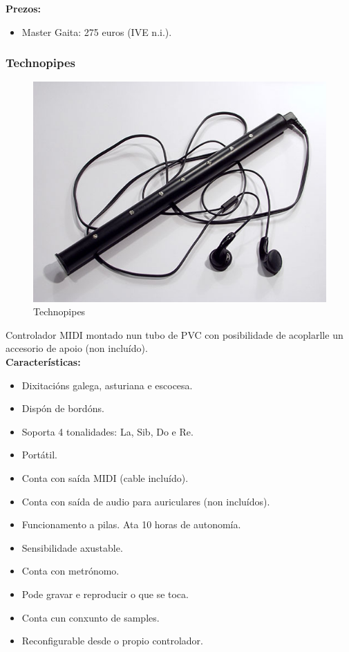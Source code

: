   \textbf{Prezos:}

  \begin{itemize}
   \item Master Gaita: 275 euros (IVE n.i.).
  \end{itemize}

 \subsubsection{Technopipes}

  \begin{figure}[htbp]
   \centering
   \includegraphics[scale=0.3,keepaspectratio=true]{./imagenes/technopipes.jpg}
   \caption[Technopipes]{Technopipes \cite{Technopipes}}
   \label{figura:Technopipes}
  \end{figure}

  Controlador MIDI montado nun tubo de PVC con posibilidade de acoplarlle un
  accesorio de apoio (non incluído). \\

  \textbf{Características:}

  \begin{itemize}
   \item Dixitacións galega, asturiana e escocesa.
   \item Dispón de bordóns.
   \item Soporta 4 tonalidades: La, Sib, Do e Re.
   \item Portátil.
   \item Conta con saída MIDI (cable incluído).
   \item Conta con saída de audio para auriculares (non incluídos).
   \item Funcionamento a pilas. Ata 10 horas de autonomía.
   \item Sensibilidade axustable.
   \item Conta con metrónomo.
   \item Pode gravar e reproducir o que se toca.
   \item Conta cun conxunto de samples.
   \item Reconfigurable desde o propio controlador.
  \end{itemize}

